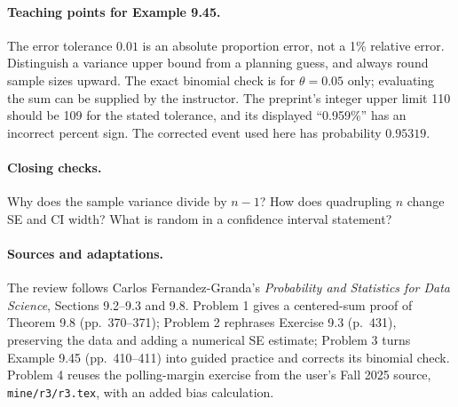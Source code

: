 \documentclass[11pt]{article}
\begin{document}
\paragraph{Teaching points for Example 9.45.}
The error tolerance $0.01$ is an absolute proportion error, not a 1\%
relative error. Distinguish a variance upper bound from a planning guess,
and always round sample sizes upward. The exact binomial check is for
$\theta=0.05$ only; evaluating the sum can be supplied by the instructor.
The preprint's integer upper limit 110 should be 109 for the stated
tolerance, and its displayed ``0.959\%'' has an incorrect percent sign.
The corrected event used here has probability $0.95319$.

\paragraph{Closing checks.}
Why does the sample variance divide by $n-1$? How does quadrupling $n$
change SE and CI width? What is random in a confidence interval statement?

\paragraph{Sources and adaptations.}
The review follows Carlos Fernandez-Granda's
\emph{Probability and Statistics for Data Science}, Sections 9.2--9.3
and 9.8. Problem 1 gives a centered-sum proof of Theorem 9.8
(pp.\ 370--371); Problem 2 rephrases Exercise 9.3 (p.\ 431), preserving
the data and adding a numerical SE estimate; Problem 3 turns Example 9.45
(pp.\ 410--411) into guided practice and corrects its binomial check.
Problem 4 reuses the polling-margin exercise from the user's Fall 2025
source, \texttt{mine/r3/r3.tex}, with an added bias calculation.
\fi
\end{document}
